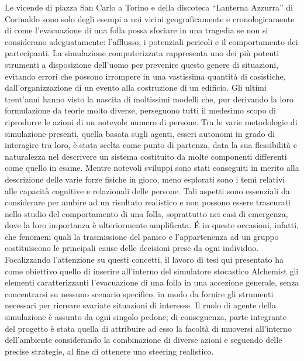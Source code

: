 Le vicende di piazza San Carlo a Torino e della discoteca \enquote{Lanterna Azzurra} di Corinaldo sono solo degli esempi a noi vicini geograficamente e cronologicamente di come l'evacuazione di una folla possa sfociare in una tragedia se non si considerano adeguatamente: l'afflusso, i potenziali pericoli e il comportamento dei partecipanti. \newline
La simulazione computerizzata rappresenta uno dei più potenti strumenti a disposizione dell'uomo per prevenire questo genere di situazioni, evitando errori che possono irrompere in una vastissima quantità di casistiche, dall'organizzazione di un evento alla costruzione di un edificio. \newline
Gli ultimi trent'anni hanno visto la nascita di moltissimi modelli che, pur derivando la loro formulazione da teorie molto diverse, perseguono tutti il medesimo scopo di riprodurre le azioni di un notevole numero di persone. Tra le varie metodologie di simulazione presenti, quella basata sugli agenti, esseri autonomi in grado di interagire tra loro, è stata scelta come punto di partenza, data la sua flessibilità e naturalezza nel descrivere un sistema costituito da molte componenti differenti come quello in esame. \newline
Mentre notevoli sviluppi sono stati conseguiti in merito alla descrizione delle varie forze fisiche in gioco, meno esplorati sono i temi relativi alle capacità cognitive e relazionali delle persone. \newline 
Tali aspetti sono essenziali da considerare per ambire ad un risultato realistico e non possono essere trascurati nello studio del comportamento di una folla, soprattutto nei casi di emergenza, dove la loro importanza è ulteriormente amplificata. É in queste occasioni, infatti, che fenomeni quali la trasmissione del panico e l'appartenenza ad un gruppo costituiscono le principali cause delle decisioni prese da ogni individuo. \newline
Focalizzando l'attenzione su questi concetti, il lavoro di tesi qui presentato ha come obiettivo quello di inserire all'interno del simulatore stocastico Alchemist gli elementi caratterizzanti l'evacuazione di una folla in una accezione generale, senza concentrarsi su nessuno scenario specifico, in modo da fornire gli strumenti necessari per ricreare svariate situazioni di interesse. \newline
Il ruolo di agente della simulazione è assunto da ogni singolo pedone; di conseguenza, parte integrante del progetto è stata quella di attribuire ad esso la facoltà di muoversi all'interno dell'ambiente considerando la combinazione di diverse azioni e seguendo delle precise strategie, al fine di ottenere uno steering realistico. \newline
